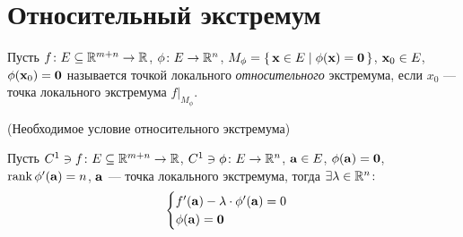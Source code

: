 \section{Относительный экстремум}

\begin{definition}
    Пусть $f \colon E \subseteq \mathbb{R}^{m + n} \to \mathbb{R}$, $\phi \colon E \to \mathbb{R}^n$,
    $M_{\phi} = \{\,\mathbf{x} \in E \mid \phi(\mathbf{x}) = \mathbf{0}\,\}$, $\mathbf{x}_0 \in E$, $\phi(\mathbf{x}_0) =
    \mathbf{0}$ называется точкой локального \textit{относительного} экстремума, если
    $x_0$ --- точка локального экстремума $f\big|_{M_{\phi}}$.
\end{definition}

\begin{theorem}(Необходимое условие относительного экстремума)

    Пусть $C^1 \ni f \colon E \subseteq \mathbb{R}^{m + n} \to \mathbb{R}$, $C^1 \ni \phi \colon
    E \to \mathbb{R}^n$, $\mathbf{a} \in E$, $\phi(\mathbf{a}) = \mathbf{0}$, $\operatorname{rank}{\phi'(\mathbf{a})} = n$,
    $\mathbf{a}$ --- точка локального экстремума, тогда $\exists \lambda \in \mathbb{R}^n
    \colon$
\[
    \begin{cases}
        f'(\mathbf{a}) - \lambda \cdot \phi'(\mathbf{a}) = 0 \\
        \phi(\mathbf{a}) = \mathbf{0}
    \end{cases}
\]
\end{theorem}
